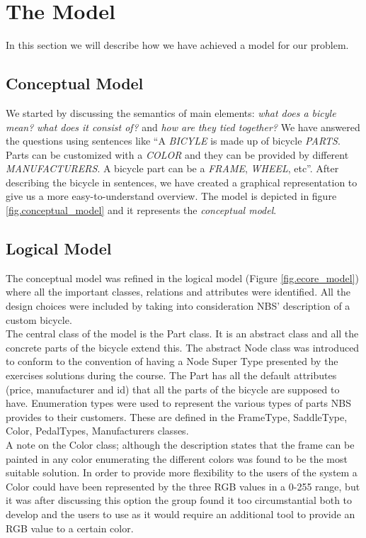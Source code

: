\section{The Model}
\label{sec.logical_model}
In this section we will describe how we have achieved a model for our problem.

\subsection{Conceptual Model}
\noindent We started by discussing the semantics of main elements: \emph{what
does a bicyle mean?} \emph{what does it consist of?} and \emph{how are they
tied together?} We have answered the questions using sentences like ``A
\emph{BICYLE} is made up of bicycle \emph{PARTS}. Parts can be customized with
a \emph{COLOR} and they can be provided by different \emph{MANUFACTURERS}.
A bicycle part can be a \emph{FRAME}, \emph{WHEEL}, etc''. After describing the
bicycle in sentences, we have created a graphical representation to give us a
more easy-to-understand overview. The model is depicted in figure
\ref{fig.conceptual_model} and it represents the \emph{conceptual model}.

\subsection{Logical Model}
\noindent The conceptual model was refined in the logical model (Figure \ref{fig.ecore_model})
where all the important classes, relations and attributes were identified. 
All the design choices were included by taking into consideration NBS' 
description of a custom bicycle.\\

\noindent The central class of the model is the Part class. It is an abstract
class and all the concrete parts of the bicycle extend this. The abstract Node 
class was introduced to conform to the convention of having a Node Super 
Type presented by the exercises solutions during the course. 
The Part has all the default attributes (price, manufacturer and id) 
that all the parts of the bicycle are supposed to have. Enumeration types 
were used to represent the various types of parts NBS provides to their 
customers. These are defined in the FrameType, SaddleType, Color, 
PedalTypes, Manufacturers classes.\\

\noindent A note on the Color class; although the description states that the 
frame can be painted in any color enumerating the different colors was 
found to be the most suitable solution. In order to provide more 
flexibility to the users of the system a Color could have been 
represented by the three RGB values in a 0-255 range, but it was 
after discussing this option the group found it too circumstantial 
both to develop and the users to use as it would require an additional 
tool to provide an RGB value to a certain color.\\

